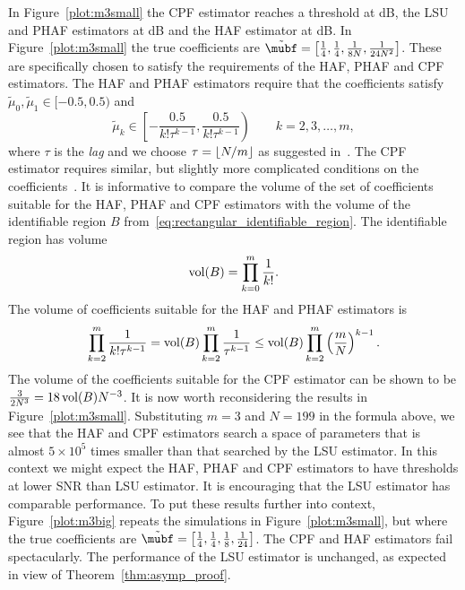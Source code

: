 \documentclass[journal]{IEEEtran}
\begin{document}
In Figure~\ref{plot:m3small} the CPF estimator reaches a threshold at \unit[1]{dB}, the LSU and PHAF estimators at \unit[3]{dB} and the HAF estimator at \unit[5]{dB}.  In Figure~\ref{plot:m3small} the true coefficients are $\tilde{\mubf} = \left[ \tfrac{1}{4}, \tfrac{1}{4}, \tfrac{1}{8N}, \tfrac{1}{24N^2}  \right]$.  These are specifically chosen to satisfy the requirements of the HAF, PHAF and CPF estimators.  The HAF and PHAF estimators require that the coefficients satisfy $\tilde{\mu}_0, \tilde{\mu}_1 \in [-0.5, 0.5)$ and
\[
\tilde{\mu}_k \in \left[ -\frac{0.5}{k! \tau^{k-1}}, \frac{0.5}{k! \tau^{k-1}}\right) \qquad k = 2,3,\dots,m,
\]
where $\tau$ is the \emph{lag} and we choose $\tau = {\left\lfloor N/m \right\rfloor}$ as suggested in~\cite{Peleg_DPT_1995,Barbarossa_PHAF_1998}.  The CPF estimator requires similar, but slightly more complicated conditions on the coefficients~\cite{Oshea_cpf_2004}.  It is informative to compare the volume of the set of coefficients suitable for the HAF, PHAF and CPF estimators with the volume of the identifiable region $B$ from~\eqref{eq:rectangular_identifiable_region}. The identifiable region has volume 
\[
\operatorname{vol}(B) = \prod_{k=0}^m {\frac{1}{k!}}.
\]
The volume of coefficients suitable for the HAF and PHAF estimators is
\[
\prod_{k=2}^m \frac{1}{k! \tau^{k-1}} =  \operatorname{vol}(B) \prod_{k=2}^m \frac{1}{\tau^{k-1}} \leq \operatorname{vol}(B) \prod_{k=2}^m \left( \frac{m}{N} \right)^{k-1}.
\]
The volume of the coefficients suitable for the CPF estimator can be shown to be $\tfrac{3}{2N^3} = 18 \operatorname{vol}(B) N^{-3}$.  It is now worth reconsidering the results in Figure~\ref{plot:m3small}.  Substituting $m=3$ and $N=199$ in the formula above, we see that the HAF and CPF estimators search a space of parameters that is almost $5 \times 10^5$ times smaller than that searched by the LSU estimator.  In this context we might expect the HAF, PHAF and CPF estimators to have thresholds at lower SNR than LSU estimator.  It is encouraging that the LSU estimator has comparable performance.  To put these results further into context, Figure~\ref{plot:m3big} repeats the simulations in Figure~\ref{plot:m3small}, but where the true coefficients are $\tilde{\mubf} = \left[ \tfrac{1}{4}, \tfrac{1}{4}, \tfrac{1}{8}, \tfrac{1}{24}  \right]$.  The CPF and HAF estimators fail spectacularly.  The performance of the LSU estimator is unchanged, as expected in view of Theorem~\ref{thm:asymp_proof}.
\end{document}

